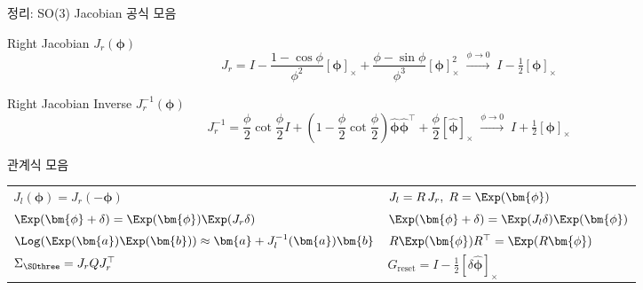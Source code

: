 \begin{frame}[shrink=25]{정리: SO(3) Jacobian 공식 모음}
  \begin{alertblock}{Right Jacobian $J_r(\bm{\phi})$}
    \small
    \[
      J_r = I - \frac{1-\cos\phi}{\phi^2}[\bm{\phi}]_\times + \frac{\phi-\sin\phi}{\phi^3}[\bm{\phi}]_\times^2
      \;\xrightarrow{\phi\to 0}\; I - \tfrac{1}{2}[\bm{\phi}]_\times
    \]
  \end{alertblock}
  \begin{alertblock}{Right Jacobian Inverse $J_r^{-1}(\bm{\phi})$}
    \small
    \[
      J_r^{-1} = \frac{\phi}{2}\cot\frac{\phi}{2}I + \left(1-\frac{\phi}{2}\cot\frac{\phi}{2}\right)\hat{\bm{\phi}}\hat{\bm{\phi}}^\top + \frac{\phi}{2}[\hat{\bm{\phi}}]_\times
      \;\xrightarrow{\phi\to 0}\; I + \tfrac{1}{2}[\bm{\phi}]_\times
    \]
  \end{alertblock}
  \begin{block}{\small 관계식 모음}
    \footnotesize
    \renewcommand{\arraystretch}{1.3}
    \begin{tabular}{ll}
      $J_l(\bm{\phi}) = J_r(-\bm{\phi})$ & $J_l = R\,J_r,\; R=\Exp(\bm{\phi})$ \\
      $\Exp(\bm{\phi}+\delta) = \Exp(\bm{\phi})\Exp(J_r\delta)$ & $\Exp(\bm{\phi}+\delta) = \Exp(J_l\delta)\Exp(\bm{\phi})$ \\
      $\Log(\Exp(\bm{a})\Exp(\bm{b})) \approx \bm{a} + J_l^{-1}(\bm{a})\bm{b}$ & $R\Exp(\bm{\phi})R^\top = \Exp(R\bm{\phi})$ \\
      $\Sigma_{\SOthree} = J_r Q J_r^\top$ & $G_{\text{reset}} = I - \tfrac{1}{2}[\delta\hat{\bm{\phi}}]_\times$ \\
    \end{tabular}
  \end{block}
\end{frame}


